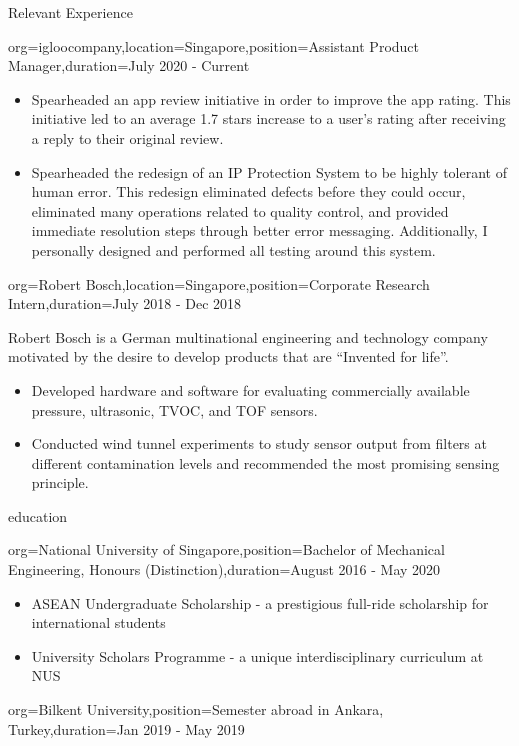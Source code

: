 \documentclass{resume}
\begin{document}
\begin{ResumeSection}{Relevant Experience}
\begin{ResumeSubsection}{org=igloocompany,location={Singapore},position={Assistant Product Manager},duration=July 2020 - Current}
\begin{itemize}
            \item Spearheaded an app review initiative in order to improve the app rating. This initiative led to an average 1.7 stars increase to a user's rating after receiving a reply to their original review.
            \item Spearheaded the redesign of an IP Protection System to be highly tolerant of human error. This redesign eliminated defects before they could occur, eliminated many operations related to quality control, and provided immediate resolution steps through better error messaging. Additionally, I personally designed and performed all testing around this system.
        \end{itemize}
    \end{ResumeSubsection}

    \begin{ResumeSubsection}{org={Robert Bosch},location={Singapore},position={Corporate Research Intern},duration={July 2018 - Dec 2018}}
    
    Robert Bosch is a German multinational engineering and technology company motivated by the desire to develop products that are “Invented for life”.
    \vspace{0.2cm}
        \begin{itemize}
        \setlength\itemsep{0.05cm}
            \item Developed hardware and software for evaluating commercially available pressure, ultrasonic, TVOC, and TOF sensors.
            \item Conducted wind tunnel experiments to study sensor output from filters at different contamination levels and recommended the most promising sensing principle.
        \end{itemize}
    \end{ResumeSubsection}
\end{ResumeSection}

\begin{ResumeSection}{education}
    \begin{ResumeSubsection}{org={National University of Singapore},position={Bachelor of Mechanical Engineering, Honours (Distinction)},duration={August 2016 - May 2020}}
    \vspace{0.2cm}
    \begin{itemize}
    \setlength\itemsep{0.05cm}
        \item ASEAN Undergraduate Scholarship - a prestigious full-ride scholarship for international students
        \item University Scholars Programme - a unique interdisciplinary curriculum at NUS
    \end{itemize}
    \end{ResumeSubsection}
    \begin{ResumeSubsection}{org={Bilkent University},position={Semester abroad in Ankara, Turkey},duration={Jan 2019 - May 2019}}
    \end{ResumeSubsection}
\end{ResumeSection}
\end{document}
